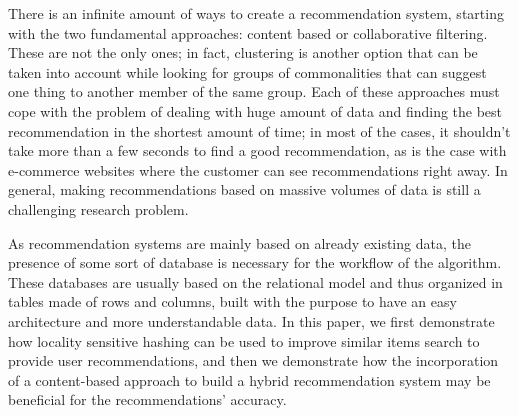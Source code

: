 There is an infinite amount of ways to create a recommendation system, starting with the two fundamental approaches: content based or collaborative filtering. These are not the only ones; in fact, clustering is another option that can be taken into account while looking for groups of commonalities that can suggest one thing to another member of the same group. Each of these approaches must cope with the problem of dealing with huge amount of data and finding the best recommendation in the shortest amount of time; in most of the cases, it shouldn't take more than a few seconds to find a good recommendation, as is the case with e-commerce websites where the customer can see recommendations right away. In general, making recommendations based on massive volumes of data is still a challenging research problem. 

As recommendation systems are mainly based on already existing data, the presence of some sort of database is necessary for the workflow of the algorithm.
These databases are usually based on the relational model and thus organized in tables made of rows and columns, built with the purpose to have an easy architecture and more understandable data. In this paper, we first demonstrate how locality sensitive hashing can be used to improve similar items search to provide user recommendations, and then we demonstrate how the incorporation of a content-based approach to build a hybrid recommendation system may be beneficial for the recommendations' accuracy. 

